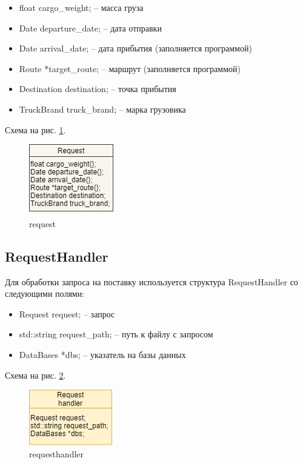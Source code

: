 \begin{itemize}
    \item float cargo\_weight{}; -- масса груза
    \item Date departure\_date{}; -- дата отправки
    \item Date arrival\_date{}; -- дата прибытия (заполняется программой)
    \item Route *target\_route{}; -- маршрут (заполняется программой)
    \item Destination destination; -- точка прибытия
    \item TruckBrand truck\_brand; -- марка грузовика
\end{itemize}

Схема на рис. \ref{request}.

\begin{figure}[hpt!]
    \centering
    \includegraphics[width=0.4\linewidth]{photo/data_structures/request}
    \caption{request}
    \label{request}
\end{figure}

\subsection{RequestHandler}

Для обработки запроса на поставку используется структура RequestHandler со следующими полями: 

\begin{itemize}
    \item Request request; -- запрос
    \item std::string request\_path; -- путь к файлу с запросом
    \item DataBases *dbs; -- указатель на базы данных
\end{itemize}

Схема на рис. \ref{request_handler}.

\begin{figure}[hpt!]
    \centering
    \includegraphics[width=0.4\linewidth]{photo/data_structures/request_handler}
    \caption{requesthandler}
    \label{request_handler}
\end{figure}
